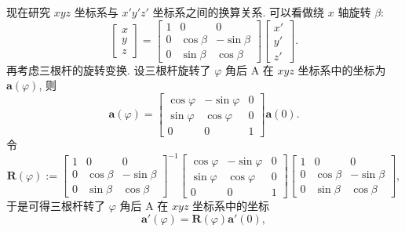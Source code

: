 \documentclass{article}
\begin{document}
现在研究 $xyz$ 坐标系与 $x'y'z'$ 坐标系之间的换算关系.
可以看做绕 $x$ 轴旋转 $\beta$:
\begin{equation}
	\left[\begin{matrix}x\\y\\z\end{matrix}\right]=
	\left[\begin{matrix}1&0&0\\0&\cos\beta&-\sin\beta\\0&\sin\beta&\cos\beta\end{matrix}\right]
	\left[\begin{matrix}x'\\y'\\z'\end{matrix}\right].
\end{equation}
再考虑三根杆的旋转变换.
设三根杆旋转了 $\varphi$ 角后 A 在 $xyz$ 坐标系中的坐标为 $\mathbf a\!\left(\varphi\right)$, 则
\begin{equation}
	\mathbf a\!\left(\varphi\right)=
	\left[\begin{matrix}\cos\varphi&-\sin\varphi&0\\\sin\varphi&\cos\varphi&0\\0&0&1\end{matrix}\right]
	\mathbf a\!\left(0\right).
\end{equation}
令
\begin{equation}
	\mathbf R\!\left(\varphi\right):=
	\left[\begin{matrix}1&0&0\\0&\cos\beta&-\sin\beta\\0&\sin\beta&\cos\beta\end{matrix}\right]^{-1}
	\left[\begin{matrix}\cos\varphi&-\sin\varphi&0\\\sin\varphi&\cos\varphi&0\\0&0&1\end{matrix}\right]
	\left[\begin{matrix}1&0&0\\0&\cos\beta&-\sin\beta\\0&\sin\beta&\cos\beta\end{matrix}\right],
\end{equation}
于是可得三根杆转了 $\varphi$ 角后 A 在 $xyz$ 坐标系中的坐标
\begin{equation}
	\label{eq:a'(phi)未展开}
	\mathbf a'\!\left(\varphi\right)=\mathbf R\!\left(\varphi\right)\mathbf a'\!\left(0\right),
\end{equation}
\end{document}
